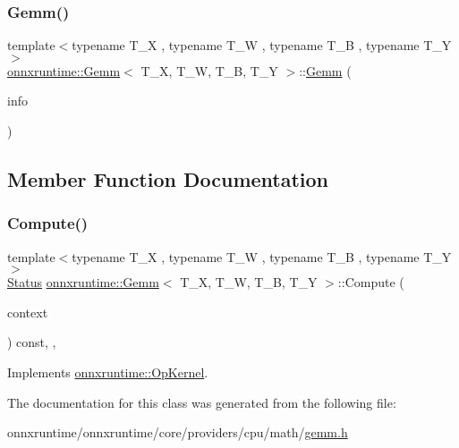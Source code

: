 \subsubsection{\texorpdfstring{Gemm()}{Gemm()}}
{\footnotesize\ttfamily template$<$typename T\+\_\+X , typename T\+\_\+W , typename T\+\_\+B , typename T\+\_\+Y $>$ \\
\mbox{\hyperlink{classonnxruntime_1_1Gemm}{onnxruntime\+::\+Gemm}}$<$ T\+\_\+X, T\+\_\+W, T\+\_\+B, T\+\_\+Y $>$\+::\mbox{\hyperlink{classonnxruntime_1_1Gemm}{Gemm}} (\begin{DoxyParamCaption}\item[{const \mbox{\hyperlink{classonnxruntime_1_1OpKernelInfo}{Op\+Kernel\+Info}} \&}]{info }\end{DoxyParamCaption})\hspace{0.3cm}{\ttfamily [inline]}}



\subsection{Member Function Documentation}
\mbox{\label{classonnxruntime_1_1Gemm_a101485edb48c02c16e452181a5134828}} 
\subsubsection{\texorpdfstring{Compute()}{Compute()}}
{\footnotesize\ttfamily template$<$typename T\+\_\+X , typename T\+\_\+W , typename T\+\_\+B , typename T\+\_\+Y $>$ \\
\mbox{\hyperlink{classonnxruntime_1_1common_1_1Status}{Status}} \mbox{\hyperlink{classonnxruntime_1_1Gemm}{onnxruntime\+::\+Gemm}}$<$ T\+\_\+X, T\+\_\+W, T\+\_\+B, T\+\_\+Y $>$\+::Compute (\begin{DoxyParamCaption}\item[{\mbox{\hyperlink{classonnxruntime_1_1OpKernelContext}{Op\+Kernel\+Context}} $\ast$}]{context }\end{DoxyParamCaption}) const\hspace{0.3cm}{\ttfamily [inline]}, {\ttfamily [override]}, {\ttfamily [virtual]}}



Implements \mbox{\hyperlink{classonnxruntime_1_1OpKernel_a9eca8656a78b1b3ab9d3351a12798650}{onnxruntime\+::\+Op\+Kernel}}.



The documentation for this class was generated from the following file\+:\begin{DoxyCompactItemize}
\item 
onnxruntime/onnxruntime/core/providers/cpu/math/\mbox{\hyperlink{cpu_2math_2gemm_8h}{gemm.\+h}}\end{DoxyCompactItemize}
